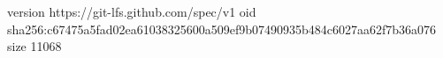 version https://git-lfs.github.com/spec/v1
oid sha256:c67475a5fad02ea61038325600a509ef9b07490935b484c6027aa62f7b36a076
size 11068
